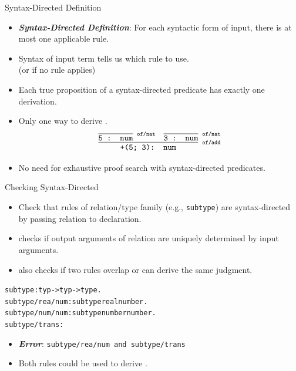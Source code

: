 \documentclass{beamer}
\renewcommand{\emph}[1]{\textbf{\textit{#1}}}
\begin{document}
\begin{frame}{Syntax-Directed Definition}
\begin{itemize}
\item \emph{Syntax-Directed Definition}:
For each syntactic form of input, there is at most one
applicable rule.
\item Syntax of input term tells us which rule to use.
\\ (or if no rule applies)
\item Each true proposition of a syntax-directed
predicate has exactly one derivation.
\item Only one way to derive
\texttt{}.
\[
\ttinfer[of/add]{+(5; 3): num}
 {\ttinfer[of/nat]{5 : num}{ }
	&
	\ttinfer[of/nat]{3 : num}{ }
 }
\]
\item No need for exhaustive proof search with
syntax-directed predicates.
\end{itemize}
\end{frame}

\begin{frame}[containsverbatim]{Checking Syntax-Directed}
\begin{itemize}
\item Check that rules of relation/type family
(e.g., \texttt{subtype}) are syntax-directed by passing relation
to \texttt{} declaration.

\item \texttt{} checks if output arguments
of relation are uniquely determined by input arguments.

\item \texttt{} also checks if two rules overlap
or can derive the same judgment.

\end{itemize}
\begin{alltt}
subtype : typ -> typ -> type.
subtype/rea/num : subtype real number.
subtype/num/num : subtype number number.
subtype/trans:
\end{alltt}
\begin{itemize}
\item \emph{Error}: \texttt{subtype/rea/num and subtype/trans }
\item Both rules could be used to derive \texttt{}.
\end{itemize}
\end{frame}
\end{document}
